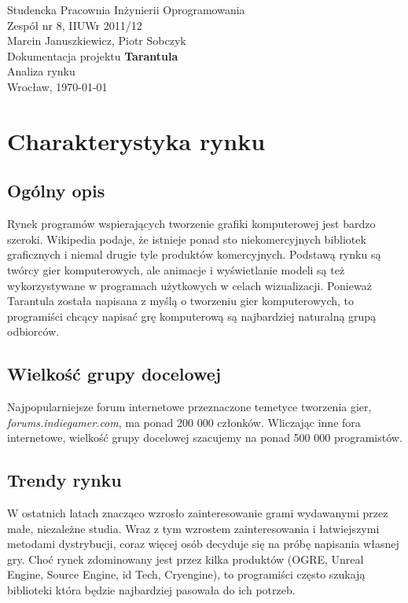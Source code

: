 \documentclass[11pt,leqno]{article}
\begin{document}
\begin{center}
\thispagestyle{empty}
{\Large Studencka Pracownia Inżynierii Oprogramowania}\\[0.5cm]
{\Large Zespół nr 8, IIUWr 2011/12}\\[2.5cm]

{Marcin Januszkiewicz, Piotr Sobczyk}\\[0.5cm]
{\huge Dokumentacja projektu \textbf{Tarantula}}\\[0.25cm]
{ Analiza rynku}\\[0.5cm]
\vfill
{\large Wrocław, \today}
\end{center}

\newpage
\tableofcontents
\newpage


\section{Charakterystyka rynku}

\subsection{Ogólny opis}
\noindent
Rynek programów wspierających tworzenie grafiki komputerowej jest bardzo szeroki. Wikipedia podaje, że istnieje ponad sto niekomercyjnych bibliotek graficznych i niemal drugie tyle produktów komercyjnych. Podstawą rynku są twórcy gier komputerowych, ale animacje i wyświetlanie modeli są też wykorzystywane w programach użytkowych w celach wizualizacji. Ponieważ Tarantula została napisana z myślą o tworzeniu gier komputerowych, to programiści chcący napisać grę komputerową są najbardziej naturalną grupą odbiorców.

\subsection{Wielkość grupy docelowej}
\noindent
Najpopularniejsze forum internetowe przeznaczone temetyce tworzenia gier, {\it forums.indiegamer.com}, ma ponad 200 000 członków. Wliczając inne fora internetowe, wielkość grupy docelowej szacujemy na ponad 500 000 programistów. 
\subsection{Trendy rynku}
\noindent
W ostatnich latach znacząco wzrosło zainteresowanie grami wydawanymi przez małe, niezależne studia. Wraz z tym wzrostem zainteresowania i łatwiejszymi metodami dystrybucji, coraz więcej osób decyduje się na próbę napisania własnej gry. Choć rynek zdominowany jest przez kilka produktów (OGRE, Unreal Engine, Source Engine, id Tech, Cryengine), to programiści często szukają biblioteki która będzie najbardziej pasowała do ich potrzeb.
\end{document}

